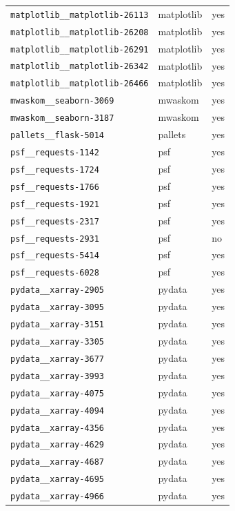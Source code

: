 \begin{longtable}{@{}p{}lp{}@{}}
\texttt{matplotlib\_\_matplotlib-26113} & matplotlib & yes \\
\texttt{matplotlib\_\_matplotlib-26208} & matplotlib & yes \\
\texttt{matplotlib\_\_matplotlib-26291} & matplotlib & yes \\
\texttt{matplotlib\_\_matplotlib-26342} & matplotlib & yes \\
\texttt{matplotlib\_\_matplotlib-26466} & matplotlib & yes \\
\texttt{mwaskom\_\_seaborn-3069} & mwaskom & yes \\
\texttt{mwaskom\_\_seaborn-3187} & mwaskom & yes \\
\texttt{pallets\_\_flask-5014} & pallets & yes \\
\texttt{psf\_\_requests-1142} & psf & yes \\
\texttt{psf\_\_requests-1724} & psf & yes \\
\texttt{psf\_\_requests-1766} & psf & yes \\
\texttt{psf\_\_requests-1921} & psf & yes \\
\texttt{psf\_\_requests-2317} & psf & yes \\
\texttt{psf\_\_requests-2931} & psf & no \\
\texttt{psf\_\_requests-5414} & psf & yes \\
\texttt{psf\_\_requests-6028} & psf & yes \\
\texttt{pydata\_\_xarray-2905} & pydata & yes \\
\texttt{pydata\_\_xarray-3095} & pydata & yes \\
\texttt{pydata\_\_xarray-3151} & pydata & yes \\
\texttt{pydata\_\_xarray-3305} & pydata & yes \\
\texttt{pydata\_\_xarray-3677} & pydata & yes \\
\texttt{pydata\_\_xarray-3993} & pydata & yes \\
\texttt{pydata\_\_xarray-4075} & pydata & yes \\
\texttt{pydata\_\_xarray-4094} & pydata & yes \\
\texttt{pydata\_\_xarray-4356} & pydata & yes \\
\texttt{pydata\_\_xarray-4629} & pydata & yes \\
\texttt{pydata\_\_xarray-4687} & pydata & yes \\
\texttt{pydata\_\_xarray-4695} & pydata & yes \\
\texttt{pydata\_\_xarray-4966} & pydata & yes \\

\end{longtable}
